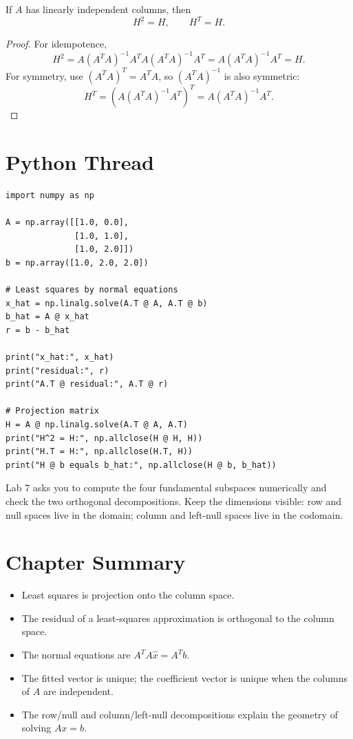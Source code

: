 \begin{proposition}
If $A$ has linearly independent columns, then
\[
  H^2=H,\qquad H^T=H.
\]
\end{proposition}

\begin{proof}
For idempotence,
\[
  H^2
  =
  A(A^TA)^{-1}A^T A(A^TA)^{-1}A^T
  =
  A(A^TA)^{-1}A^T
  =
  H.
\]
For symmetry, use $(A^TA)^T=A^TA$, so $(A^TA)^{-1}$ is also symmetric:
\[
  H^T
  =
  \left(A(A^TA)^{-1}A^T\right)^T
  =
  A(A^TA)^{-1}A^T.
\]
\end{proof}

\section{Python Thread}

\begin{lstlisting}
import numpy as np

A = np.array([[1.0, 0.0],
              [1.0, 1.0],
              [1.0, 2.0]])
b = np.array([1.0, 2.0, 2.0])

# Least squares by normal equations
x_hat = np.linalg.solve(A.T @ A, A.T @ b)
b_hat = A @ x_hat
r = b - b_hat

print("x_hat:", x_hat)
print("residual:", r)
print("A.T @ residual:", A.T @ r)

# Projection matrix
H = A @ np.linalg.solve(A.T @ A, A.T)
print("H^2 = H:", np.allclose(H @ H, H))
print("H.T = H:", np.allclose(H.T, H))
print("H @ b equals b_hat:", np.allclose(H @ b, b_hat))
\end{lstlisting}

\begin{labbox}
Lab 7 asks you to compute the four fundamental subspaces numerically and check
the two orthogonal decompositions. Keep the dimensions visible: row and null
spaces live in the domain; column and left-null spaces live in the codomain.
\end{labbox}

\section*{Chapter Summary}

\begin{itemize}
  \item Least squares is projection onto the column space.
  \item The residual of a least-squares approximation is orthogonal to the
        column space.
  \item The normal equations are $A^TA\hat{x}=A^Tb$.
  \item The fitted vector is unique; the coefficient vector is unique when
        the columns of $A$ are independent.
  \item The row/null and column/left-null decompositions explain the geometry
        of solving $Ax=b$.
\end{itemize}


